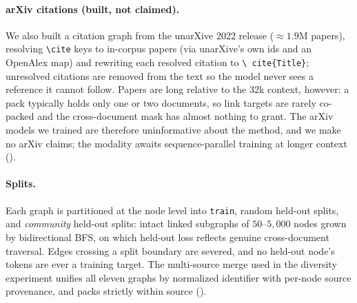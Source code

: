 \paragraph{arXiv citations (built, not claimed).}
We also built a citation graph from the unarXive 2022 release
\citep{saier2023unarxive} ($\approx1.9$M papers), resolving
\texttt{\textbackslash cite} keys to in-corpus papers (via unarXive's own ids and an
OpenAlex map) and rewriting each resolved citation to \texttt{\textbackslash
cite\{Title\}}; unresolved citations are removed from the text so the model never sees
a reference it cannot follow. Papers are long relative to the $32$k context, however:
a pack typically holds only one or two documents, so link targets are rarely co-packed
and the cross-document mask has almost nothing to grant. The arXiv models we trained
are therefore uninformative about the method, and we make no arXiv claims; the modality
awaits sequence-parallel training at longer context ().

\paragraph{Splits.}
Each graph is partitioned at the node level into \texttt{train}, random held-out
splits, and \emph{community} held-out splits: intact linked subgraphs of $50$--$5{,}000$
nodes grown by bidirectional BFS, on which held-out loss reflects genuine
cross-document traversal. Edges crossing a split boundary are severed, and no held-out
node's tokens are ever a training target. The multi-source merge used in the diversity
experiment unifies all eleven graphs by normalized identifier with per-node source
provenance, and packs strictly within source ().
